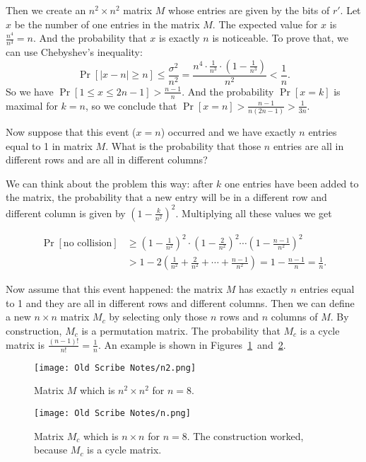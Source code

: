 Then we create an $n^2\times n^2$ matrix $M$ whose entries are given by the bits of $r'$.
Let $x$ be the number of one entries in the matrix $M$.
The expected value for $x$ is $\frac{n^4}{n^3}=n$.
And the probability that $x$ is exactly $n$ is noticeable. To prove that, we can use
Chebyshev's inequality:
$$\Pr[|x-n|\geq n]\leq\frac{\sigma^2}{n^2}=
\frac{n^4\cdot \frac{1}{n^3}\cdot\left(1-\frac{1}{n^3}\right)}{n^2}<\frac{1}{n}.$$
So we have $\Pr[1\leq x\leq 2n-1]>\frac{n-1}{n}$.
And the probability $\Pr[x=k]$ is maximal for $k=n$, so we conclude that
$\Pr[x=n]>\frac{n-1}{n(2n-1)}>\frac{1}{3n}$.

Now suppose that this event ($x=n$) occurred and we have exactly $n$ entries equal to 1
in matrix $M$. What is the probability that those $n$ entries are all in different rows
and are all in different columns?

We can think about the problem this way: after $k$ one entries have been added to the matrix,
the probability that a new entry will be in a different row and different column is given by
$\left(1-\frac{k}{n^2}\right)^2$. Multiplying all these values we get

\begin{align*}
\Pr[\text{no collision}] &\geq \left(1-\frac{1}{n^2}\right)^2 \cdot \left(1-\frac{2}{n^2}\right)^2
\cdots \left(1-\frac{n-1}{n^2}\right)^2 \\
& > 1 - 2\left(\frac{1}{n^2} + \frac{2}{n^2} +\cdots + \frac{n-1}{n^2}\right)
= 1 - \frac{n-1}{n} = \frac{1}{n}.
\end{align*}

Now assume that this event happened: the matrix $M$ has exactly $n$ entries equal to 1
and they are all in different rows and different columns.
Then we can define a new $n\times n$ matrix $M_c$ by selecting only those $n$ rows
and $n$ columns of $M$. By construction, $M_c$ is a permutation matrix.
The probability that $M_c$ is a cycle matrix is $\frac{(n-1)!}{n!}=\frac{1}{n}$.
An example is shown in Figures~\ref{fig:n2}~and~\ref{fig:n}.

\begin{figure}[ht]
	\centering
		\texttt{[image: Old Scribe Notes/n2.png]}
	\caption{Matrix $M$ which is $n^2\times n^2$ for $n=8$.}
	\label{fig:n2}
\end{figure}

\begin{figure}[ht]
	\centering
		\texttt{[image: Old Scribe Notes/n.png]}
	\caption{Matrix $M_c$ which is $n\times n$ for $n=8$. The construction worked,
	         because $M_c$ is a cycle matrix.}
	\label{fig:n}
\end{figure}


